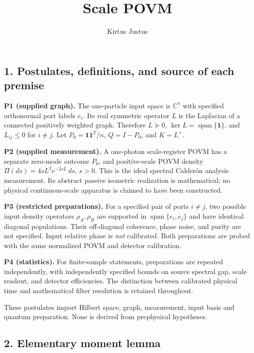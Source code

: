 \documentclass[
  10pt,
  a4paper,
]{article}
\title{Scale POVM}
\author{Kirtus Justus}
\date{}
\begin{document}
\maketitle

\subsection{1. Postulates, definitions, and source of each premise}\label{postulates-definitions-and-source-of-each-premise}

\textbf{P1 (supplied graph).} The one-particle input space is \(\mathbb C^n\) with specified orthonormal port labels \(e_i\). Its real symmetric operator \(L\) is the Laplacian of a connected positively weighted graph. Therefore \(L\succeq0\), \(\ker L=\operatorname{span}\{\mathbf1\}\), and \(L_{ij}\leq0\) for \(i\ne j\). Let \(P_0=\mathbf1\mathbf1^T/n\), \(Q=I-P_0\), and \(K=L^+\).

\textbf{P2 (supplied measurement).} A one-photon scale-register POVM has a separate zero-mode outcome \(P_0\), and positive-scale POVM density \(\Pi(ds)=4sL^2e^{-2sL}\,ds\), \(s>0\). This is the ideal spectral Calderón analysis measurement. Its abstract passive isometric realization is mathematical; no physical continuous-scale apparatus is claimed to have been constructed.

\textbf{P3 (restricted preparations).} For a specified pair of ports \(i\ne j\), two possible input density operators \(\rho_A,\rho_B\) are supported in \(\operatorname{span}\{e_i,e_j\}\) and have identical diagonal populations. Their off-diagonal coherence, phase noise, and purity are not specified. Input relative phase is \emph{not} calibrated. Both preparations are probed with the same normalized POVM and detector calibration.

\textbf{P4 (statistics).} For finite-sample statements, preparations are repeated independently, with independently specified bounds on source spectral gap, scale readout, and detector efficiencies. The distinction between calibrated physical time and mathematical filter resolution is retained throughout.

These postulates import Hilbert space, graph, measurement, input basis and quantum preparation. None is derived from prephysical hypotheses.

\subsection{2. Elementary moment lemma}\label{elementary-moment-lemma}
\end{document}
